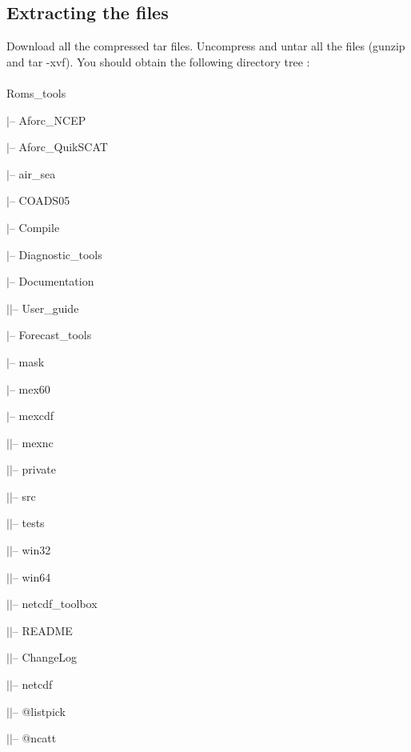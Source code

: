\subsection{Extracting the files}

Download all the compressed tar files. Uncompress and untar all 
the files (gunzip and tar -xvf). You should obtain the following 
directory tree : \\
\\
Roms\_tools

$|$-- Aforc\_NCEP

$|$-- Aforc\_QuikSCAT

$|$-- air\_sea 

$|$-- COADS05  

$|$-- Compile

$|$-- Diagnostic\_tools

$|$-- Documentation

$|$\hspace{0.5cm}$|$-- User\_guide

$|$-- Forecast\_tools

$|$-- mask

$|$-- mex60

$|$-- mexcdf

$|$\hspace{0.5cm}$|$-- mexnc

$|$\hspace{1.0cm}$|$-- private

$|$\hspace{1.0cm}$|$-- src

$|$\hspace{1.0cm}$|$-- tests

$|$\hspace{1.0cm}$|$-- win32

$|$\hspace{1.0cm}$|$-- win64

$|$\hspace{0.5cm}$|$-- netcdf\_toolbox

$|$\hspace{1.0cm}$|$-- README

$|$\hspace{1.0cm}$|$-- ChangeLog

$|$\hspace{1.0cm}$|$-- netcdf

$|$\hspace{2.0cm}$|$-- @listpick

$|$\hspace{2.0cm}$|$-- @ncatt

